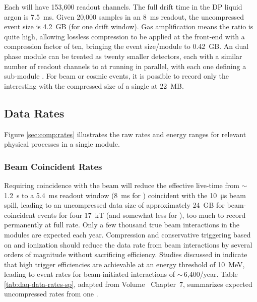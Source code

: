 Each  will have 153,600 readout channels. The full drift time in the DP liquid argon is \SI{7.5}{ms}. Given 20,000 samples in an \SI{8}{ms} readout, the uncompressed event size is \SI{4.2}{GB} (for one drift window).  Gas amplification means the  ratio is quite high, allowing lossless compression to be applied at the front-end  with a compression factor of ten, bringing the event size/module to \SI{.42}{GB}.
An   dual phase module can be treated as twenty smaller  detectors, each with a similar number  of readout channels to   %
at  running in parallel,  with each one defining a sub-module . For beam or cosmic events, it is possible to record only the interesting  with the compressed size of a single  at \SI{22}{MB}.

\subsection{Data Rates}
\label{sec:exec-comp-dt-dr}
Figure \ref{sec:comp:rates} illustrates the raw rates and energy ranges for relevant physical processes in a single   module. 

\subsubsection{Beam Coincident Rates}
\label{sec:exec-comp-dt-bcr}

Requiring  coincidence with the  beam will reduce the effective live-time from $\sim\,$\SI{1.2}{s}  to a \SI{5.4}{ms}  readout window (\SI{8}{ms} for ) coincident with the \SI{10}{\micro\second} beam spill, leading to an uncompressed data size of approximately \SI{24}{GB} for beam-coincident events for four \SI{17}{kT}  (and somewhat less for ), too much to record permanently at full rate.
Only a few thousand true beam interactions in the  modules are expected each year.  Compression and conservative triggering based on  and ionization should reduce the data rate from beam interactions by several orders of magnitude without sacrificing efficiency.  Studies discussed in %
\spchdaq{} 
indicate that high trigger efficiencies are achievable at an energy threshold of \SI{10}{MeV}, leading to event rates for beam-initiated  interactions of $\sim\,$6,400/year.
Table \ref{tab:daq-data-rates-sp}, adapted from Volume~\volnumbersp{} Chapter~7, %
 summarizes expected uncompressed rates from one . 

